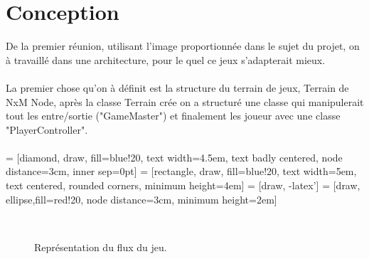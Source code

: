 \documentclass{article}
\begin{document}
\section{Conception}
De la premier réunion, utilisant l'image proportionnée dans le sujet du projet, on à travaillé dans une architecture, pour le quel ce jeux s'adapterait mieux.\\~\\
La premier chose qu'on à définit est la structure du terrain de jeux, Terrain de NxM Node, après la classe Terrain crée on a structuré une classe qui manipulerait tout les entre/sortie ("GameMaster") et finalement les joueur avec une classe "PlayerController".\\~\\
 = [diamond, draw, fill=blue!20, 
    text width=4.5em, text badly centered, node distance=3cm, inner sep=0pt]
 = [rectangle, draw, fill=blue!20, 
    text width=5em, text centered, rounded corners, minimum height=4em]
 = [draw, -latex']
 = [draw, ellipse,fill=red!20, node distance=3cm,
    minimum height=2em]
\begin{figure}[h]
\centering
{}~\\
\caption{Représentation du flux du jeu.}
\end{figure}
\end{document}
